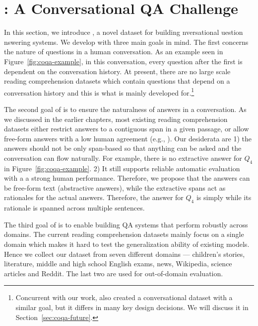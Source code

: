 
\section{: A Conversational QA Challenge}
\label{sec:coqa-dataset}

In this section, we introduce , a novel dataset for building nversational uestion nswering systems. We develop  with three main goals in mind. The first concerns the nature of questions in a human conversation. As an example seen in Figure~\ref{fig:coqa-example}, in this conversation, every question after the first is dependent on the conversation history. At present, there are no large scale reading comprehension datasets which contain questions that depend on a conversation history and this is what  is mainly developed for.\footnote{Concurrent with our work,  also created a conversational dataset with a similar goal, but it differs in many key design decisions. We will discuss it in Section~\ref{sec:coqa-future}.}

The second goal of  is to ensure the naturalness of answers in a conversation. As we discussed in the earlier chapters, most existing reading comprehension datasets either restrict answers to a contiguous span in a given passage, or allow free-form answers with a low human agreement (e.g., ). Our desiderata are 1) the answers should not be only span-based so that anything can be asked and the conversation can flow naturally. For example, there is no extractive answer for $Q_4$  in Figure~\ref{fig:coqa-example}. 2) It still supports reliable automatic evaluation with a a strong human performance. Therefore, we propose that the answers can be free-form text (abstractive answers), while the extractive spans act as rationales for the actual answers. Therefore, the answer for $Q_4$ is simply  while its rationale is spanned across multiple sentences.

The third goal of  is to enable building QA systems that perform robustly across domains. The current reading comprehension datasets mainly focus on a single domain which makes it hard to test the generalization ability of existing models. Hence we collect our dataset from seven different domains --- children's stories, literature, middle and high school English exams, news, Wikipedia, science articles and Reddit. The last two are used for out-of-domain evaluation.

